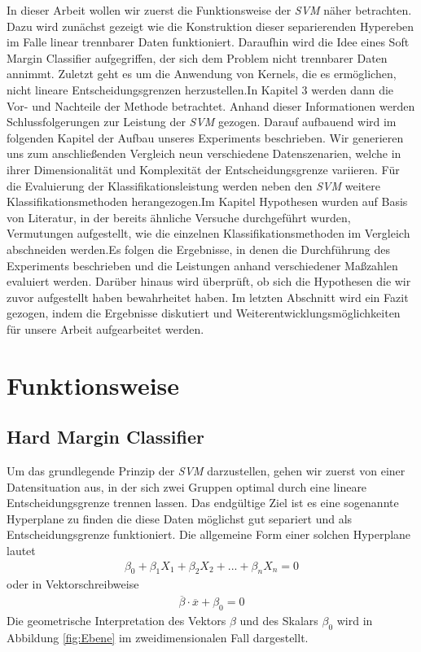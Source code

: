 \documentclass[
]{article}
\begin{document}
In dieser Arbeit wollen wir zuerst die Funktionsweise der \textit{SVM}
näher betrachten. Dazu wird zunächst gezeigt wie die Konstruktion dieser
separierenden Hypereben im Falle linear trennbarer Daten funktioniert.
Daraufhin wird die Idee eines Soft Margin Classifier aufgegriffen, der
sich dem Problem nicht trennbarer Daten annimmt. Zuletzt geht es um die
Anwendung von Kernels, die es ermöglichen, nicht lineare
Entscheidungsgrenzen herzustellen.\newline In Kapitel 3 werden dann die
Vor- und Nachteile der Methode betrachtet. Anhand dieser Informationen
werden Schlussfolgerungen zur Leistung der \textit{SVM} gezogen. Darauf
aufbauend wird im folgenden Kapitel der Aufbau unseres Experiments
beschrieben. Wir generieren uns zum anschließenden Vergleich neun
verschiedene Datenszenarien, welche in ihrer Dimensionalität und
Komplexität der Entscheidungsgrenze variieren. Für die Evaluierung der
Klassifikationsleistung werden neben den \textit{SVM} weitere
Klassifikationsmethoden herangezogen.\newline Im Kapitel Hypothesen
wurden auf Basis von Literatur, in der bereits ähnliche Versuche
durchgeführt wurden, Vermutungen aufgestellt, wie die einzelnen
Klassifikationsmethoden im Vergleich abschneiden werden.\newline Es
folgen die Ergebnisse, in denen die Durchführung des Experiments
beschrieben und die Leistungen anhand verschiedener Maßzahlen evaluiert
werden. Darüber hinaus wird überprüft, ob sich die Hypothesen die wir
zuvor aufgestellt haben bewahrheitet haben. Im letzten Abschnitt wird
ein Fazit gezogen, indem die Ergebnisse diskutiert und
Weiterentwicklungsmöglichkeiten für unsere Arbeit aufgearbeitet werden.

\section{Funktionsweise}

\subsection{Hard Margin Classifier}

Um das grundlegende Prinzip der \textit{SVM} darzustellen, gehen wir
zuerst von einer Datensituation aus, in der sich zwei Gruppen optimal
durch eine lineare Entscheidungsgrenze trennen lassen. Das endgültige
Ziel ist es eine sogenannte Hyperplane zu finden die diese Daten
möglichst gut separiert und als Entscheidungsgrenze funktioniert. Die
allgemeine Form einer solchen Hyperplane lautet \begin{align}
\beta_0+ \beta_1 X_1+\beta_2 X_2+...+\beta_n X_n=0\label{eq:hyperebene}
\end{align} oder in Vektorschreibweise \begin{align}
\overline{\beta}\cdot\overline{x}+\beta_0=0 \label{eq:hyperplanevec}
\end{align} Die geometrische Interpretation des Vektors \(\beta\) und
des Skalars \(\beta_0\) wird in Abbildung \ref{fig:Ebene} im
zweidimensionalen Fall dargestellt.
\end{document}
